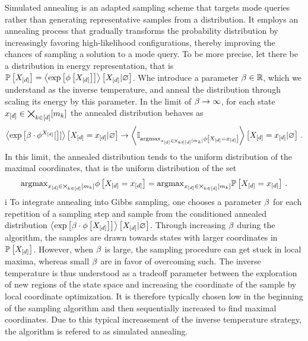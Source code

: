 Simulated annealing is an adapted sampling scheme that targets mode queries rather than generating representative samples from a distribution.
It employs an annealing process that gradually transforms the probability distribution by increasingly favoring high-likelihood configurations, thereby improving the chances of sampling a solution to a mode query.
To be more precise, let there be a distribution in energy representation, that is $\mathbb{P}\left[X_{[d]}\right]=\left\langle \mathrm{exp}\left[\phi\left[X_{[d]}\right]\right]\right\rangle \left[ X_{[d]} | \varnothing \right]$.
Whe introduce a parameter $\beta\in\mathbb{R}$, which we understand as the inverse temperature, and anneal the distribution through scaling its energy by this parameter.
In the limit of $\beta\rightarrow\infty$, for each state $x_{[d]}\in\bigtimes_{k\in[d]}[m_{k}]$ the annealed distribution behaves as
\begin{align*}
    \left\langle \mathrm{exp}\left[\beta\cdot\phi^{X_{[d]}}[\right]]\right\rangle \left[ X_{[d]}=x_{[d]} | \varnothing \right] \rightarrow
    \left\langle \mathbb{I}_{\mathrm{argmax}_{x_{[d]}\in\bigtimes_{k\in[d]}[m_{k}]}\phi\left[X_{[d]}=x_{[d]}\right]}\right\rangle \left[ X_{[d]}=x_{[d]} | \varnothing \right] \, .
\end{align*}
In this limit, the annealed distribution tends to the uniform distribution of the maximal coordinates, that is the uniform distribution of the set
\begin{align*}
    \mathrm{argmax}_{x_{[d]}\in\bigtimes_{k\in[d]}[m_{k}]}\phi\left[X_{[d]}=x_{[d]}\right] = \mathrm{argmax}_{x_{[d]}\in\bigtimes_{k\in[d]}[m_{k}]}\mathbb{P}\left[X_{[d]}=x_{[d]}\right] \, .
\end{align*}
i
To integrate annealing into Gibbs sampling, one chooses a parameter $\beta$ for each repetition of a sampling step and sample from the conditioned annealed distribution $\left\langle \mathrm{exp}\left[\beta\cdot\phi\left[X_{[d]}\right]\right]\right\rangle \left[ X_{[d]} | \varnothing \right]$.
Through increasing $\beta$ during the algorithm, the samples are drawn towards states with larger coordinates in $\mathbb{P}\left[X_{[d]}\right]$.
However, when $\beta$ is large, the sampling procedure can get stuck in local maxima, whereas small $\beta$ are in favor of overcoming such.
The inverse temperature is thus understood as a tradeoff parameter between the exploration of new regions of the state space and increasing the coordinate of the sample by local coordinate optimization.
It is therefore typically chosen low in the beginning of the sampling algorithm and then sequentially increased to find maximal coordinates.
Due to this typical increasement of the inverse temperature strategy, the algorithm is refered to as simulated annealing.


